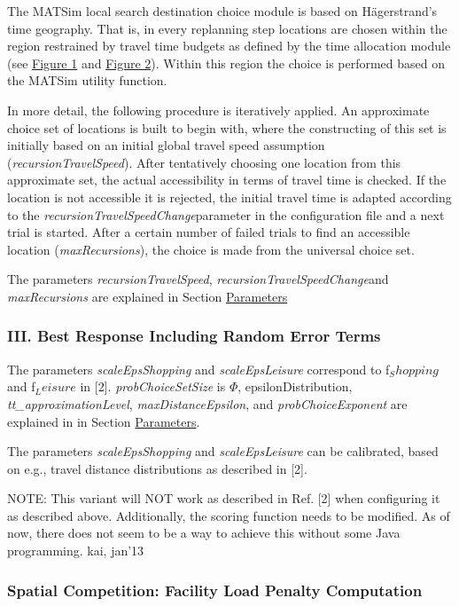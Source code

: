 \documentclass[a4paper,11pt]{report}
\begin{document}
The MATSim local search destination choice module is  based on Hägerstrand's time geography. That is, in every replanning step  locations are chosen within the region restrained by travel time  budgets as defined by the time allocation module (see \hyperlink{Figure1}{Figure 1} and \hyperlink{Figure2}{Figure 2}). Within this region the choice is performed based on the MATSim utility function.

In more detail, the following procedure is  iteratively applied. An approximate choice set of locations is built to  begin with, where the constructing of this set is initially based on an  initial global travel speed assumption (\emph{recursionTravelSpeed}).  After tentatively choosing one location from this approximate set, the  actual accessibility in terms of travel time is checked. If the location  is not accessible it is rejected, the initial travel time is adapted  according to the \emph{recursionTravelSpeedChange}parameter  in the configuration file and a next trial is started. After a certain  number of failed trials to find an accessible location (\emph{maxRecursions}), the choice is made from the universal choice set.

The parameters \emph{recursionTravelSpeed}, \emph{recursionTravelSpeedChange}and \emph{maxRecursions }are explained in Section \hyperlink{parameters}{Parameters}


\subsubsection{\textbf{III. Best Response Including Random Error Terms}}

The parameters \emph{scaleEpsShopping }and \emph{scaleEpsLeisure }correspond to f$_Shopping$ and f$_Leisure$ in [2]. \emph{probChoiceSetSize }is $\Phi$, epsilonDistribution, \emph{tt\_}\emph{approximationLevel}, \emph{maxDistanceEpsilon}, and \emph{probChoiceExponent }are explained in in Section \hyperlink{parameters}{Parameters}.

The parameters \emph{scaleEpsShopping }and \emph{scaleEpsLeisure }can be calibrated, based on e.g., travel distance distributions as described in [2].

NOTE: This  variant will NOT work as described in Ref. [2] when configuring it as  described above. Additionally, the scoring function needs to be  modified. As of now, there does not seem to be a way to achieve  this without some Java programming. kai, jan'13

\subsubsection{\textbf{Spatial Competition: Facility Load Penalty Computation}}
\end{document}
